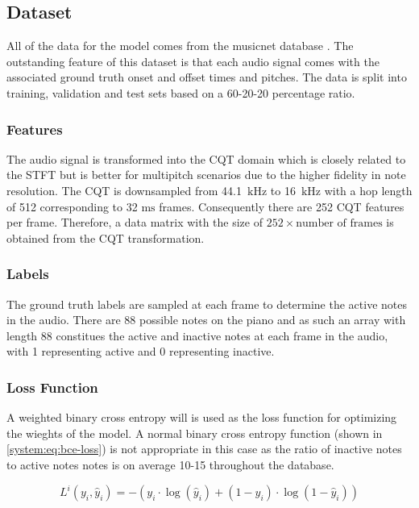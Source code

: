 \subsection{Dataset}

All of the data for the model comes from the musicnet database \cite{thickstun2018invariances}.
The outstanding feature of this dataset is that each audio signal comes with the associated ground truth
onset and offset times and pitches. The data is split into training, validation and test sets based on a 60-20-20
percentage ratio.

\subsubsection{Features}
The audio signal is transformed into the \ac{CQT} domain
which is closely related to the STFT but is better for multipitch scenarios due
to the higher fidelity in note resolution. The \ac{CQT} is downsampled from
44.1~$\si{\kilo\hertz}$ to 16~$\si{\kilo\hertz}$ with a hop length of 512
corresponding to 32 $\si{\milli\second}$ frames. Consequently there are 252 \ac{CQT}
features per frame. Therefore, a data matrix with the size of $252 \times
    \text{number of frames}$ is obtained from the \ac{CQT} transformation.

\subsubsection{Labels}
The ground truth labels are sampled at each frame to determine the active notes
in the audio. There are 88 possible notes on the piano and as such an array with
length 88 constitues the active and inactive notes at each frame in the audio,
with 1 representing active and 0 representing inactive.

\subsubsection{Loss Function}

A weighted binary cross entropy will is used as the loss function for optimizing
the wieghts of the model. A normal binary cross entropy function (shown in \autoref{system:eq:bce-loss}) is not
appropriate in this case as the ratio of inactive notes to active notes notes is
on average 10-15 throughout the database.

\begin{equation}
    L^{i} (y_{i}, \hat{y}_{i}) = -(y_{i}\cdot \log(\hat{y}_{i}) + (1-y_{i}) \cdot \log(1-\hat{y}_{i}))
    \label{system:eq:bce-loss}
\end{equation}

